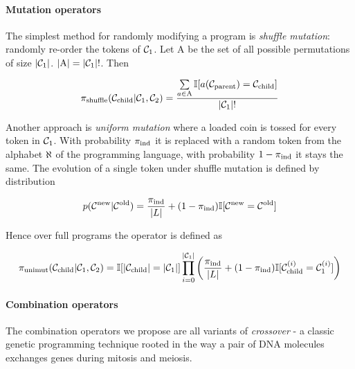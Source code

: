 \paragraph{Mutation operators}

The simplest method for randomly modifying a program is \emph{shuffle mutation}: randomly re-order the tokens of $\mathcal{C}_1$.
Let $\mathrm{A}$ be the set of all possible permutations of size $|\mathcal{C}_1|$. $|\mathrm{A}|=|\mathcal{C}_1|!$. 
Then

\begin{equation}
    \pi_\text{shuffle}(\mathcal{C}_\text{child}|\mathcal{C}_1,\mathcal{C}_2) =
            \frac{\sum\limits_{a \in \mathrm{A}} \mathbb{I}[a(\mathcal{C}_\text{parent}) = \mathcal{C}_\text{child}]}{|\mathcal{C}_1|!}
\end{equation}

Another approach is \emph{uniform mutation} where a loaded coin is tossed for every token in $\mathcal{C}_1$. 
With probability $\pi_\text{ind}$ it is replaced with a random token from the alphabet $\aleph$ of the programming language, with probability $1-\pi_\text{ind}$ it stays the same.
The evolution of a single token under shuffle mutation is defined by distribution

\begin{equation}
    p(\mathcal{C}^\text{new} | \mathcal{C}^\text{old}) = \frac{\pi_\text{ind}}{|L|} +  (1 - \pi_\text{ind}) \mathbb{I}[\mathcal{C}^\text{new} = \mathcal{C}^\text{old}]
\end{equation}

Hence over full programs the operator is defined as

\begin{equation}
    \pi_\text{unimut}(\mathcal{C}_\text{child}|\mathcal{C}_1,\mathcal{C}_2) = \mathbb{I}[|\mathcal{C}_\text{child}|=|\mathcal{C}_1|] \\ 
    \prod\limits_{i=0}^{|\mathcal{C}_1|}  \left(\frac{\pi_\text{ind}}{|L|} +  (1 - \pi_\text{ind}) \mathbb{I}[\mathcal{C}_\text{child}^{(i)} = \mathcal{C}_1^{(i)}] \right)
\end{equation}

\paragraph{Combination operators}

The combination operators we propose are all variants of \emph{crossover} - a classic genetic programming technique rooted in the way a pair of DNA molecules exchanges genes during mitosis and meiosis.


